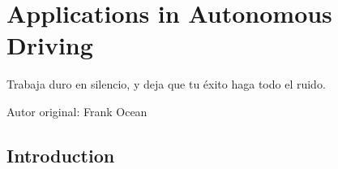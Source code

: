 % 
% 
% 
% 
% 
% 
% 

\chapter{Applications in Autonomous Driving}
\label{cha:applications_in_autonomous_driving}

\begin{FraseCelebre}
	\begin{Frase}
		Trabaja duro en silencio,
		y deja que tu éxito haga todo el ruido.
	\end{Frase}
	\begin{Fuente}
		Autor original: Frank Ocean
	\end{Fuente}
\end{FraseCelebre}

\section{Introduction}
\label{sec:8_introduction}


